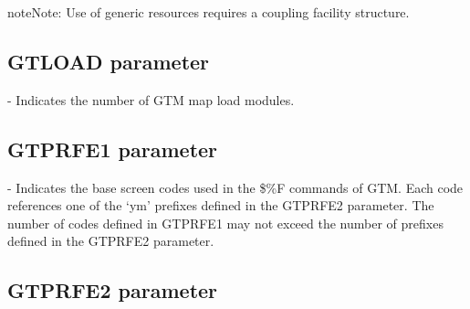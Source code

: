 \documentclass[letterpaper,10pt,english]{sphinxmanual}
\begin{document}
\begin{sphinxadmonition}{note}{Note:}
Use of generic resources requires a coupling facility structure.
\end{sphinxadmonition}


\subsection{GTLOAD parameter}
\label{\detokenize{Installation_Guide:index-69}}\label{\detokenize{Installation_Guide:gtload-parameter}}
\begin{sphinxVerbatim}[commandchars=\\\{\}]
                
\end{sphinxVerbatim}

 - Indicates the number of GTM map load modules.


\subsection{GTPRFE1 parameter}
\label{\detokenize{Installation_Guide:index-70}}\label{\detokenize{Installation_Guide:gtprfe1-parameter}}
\begin{sphinxVerbatim}[commandchars=\\\{\}]
    
\end{sphinxVerbatim}

 - Indicates the base screen codes used in the \$\%F commands of GTM. Each code references one of the ‘ym’ prefixes defined in the GTPRFE2 parameter. The number of codes defined in GTPRFE1 may not exceed the number of prefixes defined in the GTPRFE2 parameter.


\subsection{GTPRFE2 parameter}
\label{\detokenize{Installation_Guide:index-71}}\label{\detokenize{Installation_Guide:gtprfe2-parameter}}
\begin{sphinxVerbatim}[commandchars=\\\{\}]
     
\end{sphinxVerbatim}
\end{document}
